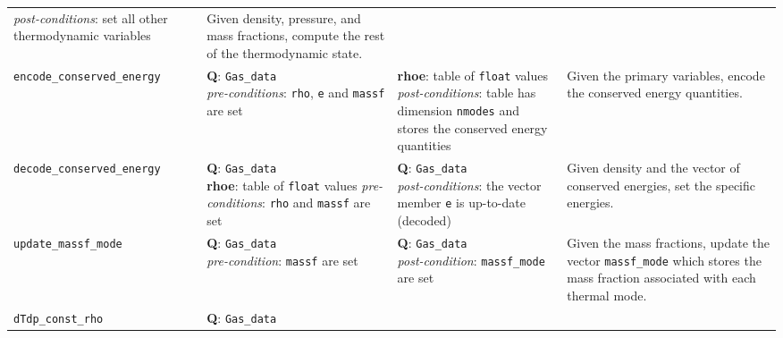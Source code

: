 \begin{landscape}
\begin{center}
\begin{longtable}{p{5.5cm}p{4.5cm}p{4.5cm}p{6.5cm}}
{                                                  \textit{post-conditions}: set all other thermodynamic variables} 
                                   &   Given density, pressure, and mass fractions,
                                       compute the rest of the thermodynamic state. \\
\texttt{encode\_conserved\_energy} & \raggedright{\textbf{Q}: \texttt{Gas\_data} \\
                                                  \textit{pre-conditions}: \texttt{rho}, \texttt{e} and \texttt{massf} are set} 
                                   & \raggedright{\textbf{rhoe}: table of \texttt{float} values \\
                                                  \textit{post-conditions}: table has dimension \texttt{nmodes} and stores
                                                  the conserved energy quantities} 
                                   & Given the primary variables, encode the conserved energy quantities. \\
\texttt{decode\_conserved\_energy} & \raggedright{\textbf{Q}: \texttt{Gas\_data} \\
                                                  \textbf{rhoe}: table of \texttt{float} values
                                                  \textit{pre-conditions}: \texttt{rho} and \texttt{massf} are set} 
                                   & \raggedright{\textbf{Q}: \texttt{Gas\_data} \\
                                                  \textit{post-conditions}: the vector member \texttt{e} is up-to-date (decoded)} 
                                   & Given density and the vector of conserved energies, set the specific energies. \\
\texttt{update\_massf\_mode}       & \raggedright{\textbf{Q}: \texttt{Gas\_data} \\
                                                  \textit{pre-condition}: \texttt{massf} are set}
                                   & \raggedright{\textbf{Q}: \texttt{Gas\_data} \\
                                                  \textit{post-condition}: \texttt{massf\_mode} are set}
                                   & Given the mass fractions, update the vector \texttt{massf\_mode} which
                                     stores the mass fraction associated with each thermal mode. \\
\texttt{dTdp\_const\_rho}          & \raggedright{\textbf{Q}: \texttt{Gas\_data} \\
}
\end{longtable}
\end{center}
\end{landscape}

